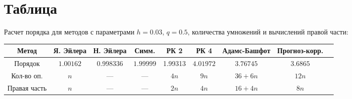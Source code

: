 \documentclass[12pt, a4paper]{article}
\begin{document}
\section{Таблица}

Расчет порядка для методов с параметрами $h = 0{.}03$,  $q = 0{.}5$, количества умножений и вычислений правой части:
\noindent\begin{center}
\hspace*{-25mm}\begin{tabular}{|c|c|c|c|c|c|c|c|c|}
\hline
Метод & Я. Эйлера  & Н. Эйлера  & Симм.  & РК 2 & РК 4  &Адамс-Башфот & Прогноз-корр. \\
\hline
Порядок &$1{.}00162$&0{.}998336&$1{.}99999$&1{.}99313&$4{.}01972$&$3{.}76745$&$3{.}6865$\\
\hline
Кол-во оп. &$n$&---&---&$4n$&$9n$&$36 + 6n$&$12n$\\
\hline
Правая часть &$n$&---&---&$2n$&$4n$&$16 + 4n$&$8n$\\
\hline
\end{tabular}
\end{center}
\newpage
\end{document}
